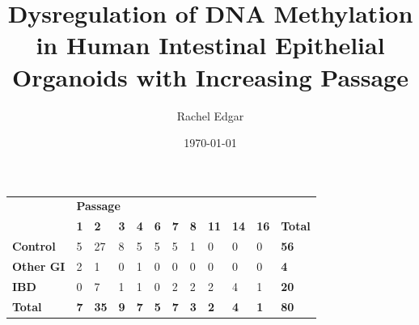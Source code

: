 \documentclass[a4paper]{article}
\title{Dysregulation of DNA Methylation in Human Intestinal Epithelial Organoids with Increasing Passage}
\author{Rachel Edgar}
\date{\today}
\begin{document}
\maketitle

\newpage


\begin{table}[]
\begin{tabular}{lllllllllll|l}
\hline
\rowcolor[HTML]{EFEFEF} 
\cellcolor[HTML]{EFEFEF}                                     & \multicolumn{10}{l}{\cellcolor[HTML]{EFEFEF}\textbf{Passage}}                                                                       & \cellcolor[HTML]{EFEFEF}                                 \\
\rowcolor[HTML]{EFEFEF} 
\multirow{-2}{*}{\cellcolor[HTML]{EFEFEF}\textbf{Diagnosis}} & \textbf{1} & \textbf{2}  & \textbf{3} & \textbf{4} & \textbf{6} & \textbf{7} & \textbf{8} & \textbf{11} & \textbf{14} & \textbf{16} & \multirow{-2}{*}{\cellcolor[HTML]{EFEFEF}\textbf{Total}} \\ \hline
\cellcolor[HTML]{EFEFEF}\textbf{Control}                     & 5          & 27          & 8          & 5          & 5          & 5          & 1          & 0           & 0           & 0           & \textbf{56}                                              \\
\cellcolor[HTML]{EFEFEF}\textbf{Other GI}                    & 2          & 1           & 0          & 1          & 0          & 0          & 0          & 0           & 0           & 0           & \textbf{4}                                               \\
\cellcolor[HTML]{EFEFEF}\textbf{IBD}                          & 0          & 7           & 1          & 1          & 0          & 2          & 2          & 2           & 4           & 1           & \textbf{20}                                              \\
\cellcolor[HTML]{EFEFEF}\textbf{Total}                       & \textbf{7} & \textbf{35} & \textbf{9} & \textbf{7} & \textbf{5} & \textbf{7} & \textbf{3} & \textbf{2}  & \textbf{4}  & \textbf{1}  & \textbf{80}                                              \\ \hline
\end{tabular}
\end{table}
\end{document}
